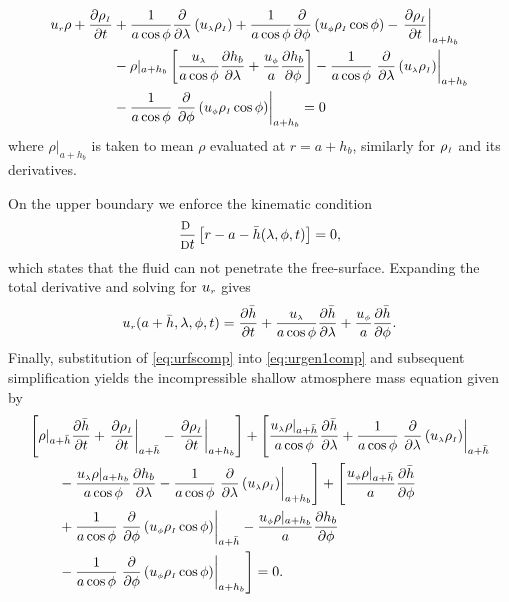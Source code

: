 \begin{align}
{\ensuremath{u_{\scriptscriptstyle r}}} \rho + {\frac{\partial {\ensuremath{\rho_{\scriptscriptstyle I}}}}{\partial t}} &+ \frac{1}{a\cos\phi}\frac{\partial}{\partial \lambda}\left({u_{\scriptscriptstyle \lambda}} {\rho_{\scriptscriptstyle I}} \right)+\frac{1}{a\cos\phi}\frac{\partial}{\partial \phi}\left({u_{\scriptscriptstyle \phi}} {\rho_{\scriptscriptstyle I}} \cos\phi\right)- \left.{\frac{\partial {\ensuremath{\rho_{\scriptscriptstyle I}}}}{\partial t}}\right|_{a+h_b} \notag\\
&-\rho|_{a+h_b}\left[ \frac{{u_{\scriptscriptstyle \lambda}}}{a\cos\phi}{\frac{\partial h_b}{\partial \lambda}} + \frac{{u_{\scriptscriptstyle \phi}}}{a}{\frac{\partial h_b}{\partial \phi}} \right]  - \frac{1}{a\cos\phi}\left.\frac{\partial}{\partial \lambda}\left({u_{\scriptscriptstyle \lambda}} {\rho_{\scriptscriptstyle I}} \right)\right|_{a+h_b} \notag\\&- \frac{1}{a\cos\phi}\left.\frac{\partial}{\partial \phi}\left({u_{\scriptscriptstyle \phi}} {\rho_{\scriptscriptstyle I}} \cos\phi \right)\right|_{a+h_b} = 0 \label{eq:urgen1comp}
\end{align}
where $\rho|_{a+h_b}$ is taken to mean $\rho$ evaluated at $r=a+h_b$, similarly for ${\rho_{\scriptscriptstyle I}}$ and its derivatives.

On the upper boundary we enforce the kinematic condition 
\begin{equation*}
\frac{\mbox{\footnotesize D\ }}{\mbox{\footnotesize D}t}\left[r-a-\bar{h}(\lambda,\phi,t)\right]=0,
\end{equation*} which states that the fluid can not penetrate the free-surface. Expanding the total derivative and solving for ${u_{\scriptscriptstyle r}}$ gives
\begin{equation}
\ur(a+\bar{h},\lambda,\phi,t)=\dhd{t}+\frac{\ulam}{a\cos\phi}\dhd{\lambda}+\frac{\uphi}{a}\dhd{\phi}.
\label{eq:urfscomp}
\end{equation}
Finally, substitution of \eqref{eq:urfscomp} into \eqref{eq:urgen1comp} and subsequent simplification yields the incompressible shallow atmosphere mass equation given by
\begin{align}
&\Biggl[\rho|_{a+\bar{h}} {\frac{\partial \bar{h}}{\partial t}} + \left.{\frac{\partial {\ensuremath{\rho_{\scriptscriptstyle I}}}}{\partial t}}\right|_{a+\bar{h}} - \left.{\frac{\partial {\ensuremath{\rho_{\scriptscriptstyle I}}}}{\partial t}}\right|_{a+h_b}\Biggr]+\Biggl[\frac{{u_{\scriptscriptstyle \lambda}} \rho|_{a+\bar{h}}}{a\cos\phi}{\frac{\partial \bar{h}}{\partial \lambda}} +\frac{1}{a\cos\phi}\left.\frac{\partial}{\partial \lambda}\left({u_{\scriptscriptstyle \lambda}} {\rho_{\scriptscriptstyle I}} \right)\right|_{a+\bar{h}} \notag \\
& \qquad - \frac{{u_{\scriptscriptstyle \lambda}} \rho|_{a+h_b}}{a\cos\phi}{\frac{\partial h_b}{\partial \lambda}} -\frac{1}{a\cos\phi}\left.\frac{\partial}{\partial \lambda}\left({u_{\scriptscriptstyle \lambda}} {\rho_{\scriptscriptstyle I}} \right)\right|_{a+h_b} \Biggr] + \Biggl[\frac{{u_{\scriptscriptstyle \phi}} \rho|_{a+\bar{h}}}{a}{\frac{\partial \bar{h}}{\partial \phi}} \notag \\
& \qquad +\frac{1}{a\cos\phi}\left.\frac{\partial}{\partial \phi}\left({u_{\scriptscriptstyle \phi}} {\rho_{\scriptscriptstyle I}} \cos\phi \right)\right|_{a+\bar{h}} - \frac{{u_{\scriptscriptstyle \phi}} \rho|_{a+h_b}}{a}{\frac{\partial h_b}{\partial \phi}} \notag \\&\qquad -\frac{1}{a\cos\phi}\left.\frac{\partial}{\partial \phi}\left({u_{\scriptscriptstyle \phi}} {\rho_{\scriptscriptstyle I}} \cos\phi\right)\right|_{a+h_b} \Biggr] = 0. \label{eq:compmassunsimp}
\end{align}

